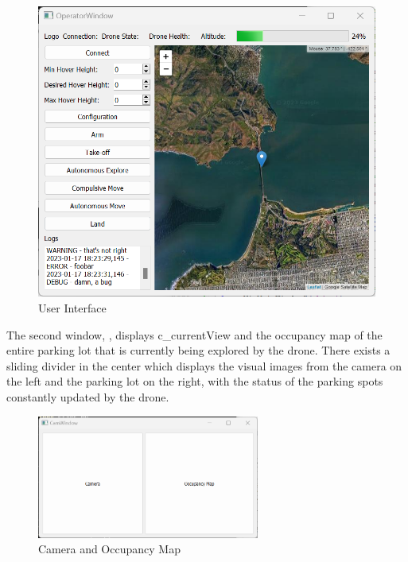 \documentclass[12pt, titlepage]{article}
\begin{document}
\begin{figure}[h!]
  \begin{center} 
  \caption{User Interface}
  \label{UserInterface}
        \includegraphics[width=1\textwidth]{UserInterface.png}
  \end{center}
\end{figure}

\clearpage

The second window, , displays c\_currentView and the occupancy map of the entire parking lot that is currently being explored by the drone. There exists a sliding divider in the center which displays the visual images from the camera on the left and the parking lot on the right, with the status of the parking spots constantly updated by the drone. \\

\begin{figure}[h!]
  \begin{center} 
  \caption{Camera and Occupancy Map}
  \label{CameraandOccupancy}
        \includegraphics[width=0.65\textwidth]{CamOcc.png}
  \end{center}
\end{figure}
\end{document}
